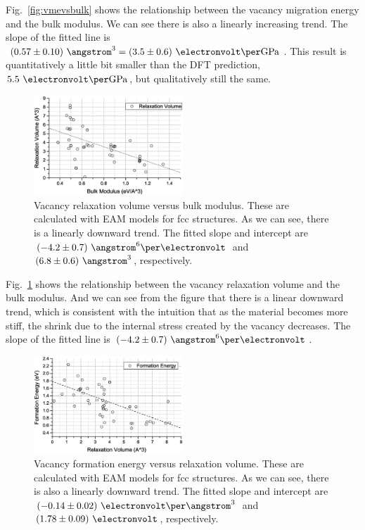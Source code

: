 \documentclass[%
 reprint,
 nofootinbib,
 amsmath,amssymb,
 aps,
]{revtex4-1}
\begin{document}
Fig.~\ref{fig:vmevsbulk} shows the relationship between the vacancy migration energy and the bulk modulus.
We can see there is also a linearly increasing trend.
The slope of the fitted line is $(0.57\pm0.10)~\angstrom^3 = (3.5\pm0.6)~\electronvolt\per\mathrm{GPa}$.
This result is quantitatively a little bit smaller than the DFT prediction, $5.5~\electronvolt\per\mathrm{GPa}$, but qualitatively still the same.

\begin{figure}
\centering
\includegraphics[width=0.5\textwidth, clip, trim = 10mm 3mm 10mm 10mm]{vrv_vs_bulk}%
\caption{\label{fig:vrvvsbulk}
Vacancy relaxation volume versus bulk modulus.
These are calculated with EAM models for fcc structures.
As we can see, there is a linearly downward trend.
The fitted slope and intercept are $(-4.2\pm0.7)~\angstrom^6\per\electronvolt$ and $(6.8\pm0.6)~\angstrom^3$, respectively.
}
\end{figure}

Fig.~\ref{fig:vrvvsbulk} shows the relationship between the vacancy relaxation volume and the bulk modulus.
And we can see from the figure that there is a linear downward trend, which is consistent with the intuition that as the material becomes more stiff, the shrink due to the internal stress created by the vacancy decreases.
The slope of the fitted line is $(-4.2\pm0.7)~\angstrom^6\per\electronvolt$.

\begin{figure}
\centering
\includegraphics[width=0.5\textwidth, clip, trim = 10mm 3mm 10mm 10mm]{vfe_vs_vrv}%
\caption{\label{fig:vfevsvrv}
Vacancy formation energy versus relaxation volume.
These are calculated with EAM models for fcc structures.
As we can see, there is also a linearly downward trend.
The fitted slope and intercept are $(-0.14\pm0.02)~\electronvolt\per\angstrom^3$ and $(1.78\pm0.09)~\electronvolt$, respectively.
}
\end{figure}
\end{document}
